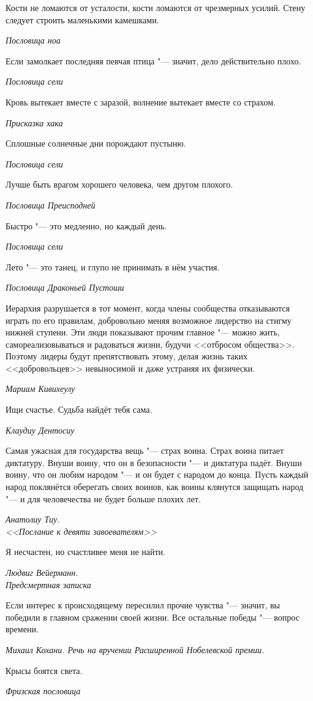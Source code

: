\documentclass[a4paper,10pt]{book}
\begin{document}
\epigraph{Кости не ломаются от усталости, кости ломаются от чрезмерных усилий. Стену следует строить маленькими камешками.}
{\textit{Пословица ноа}}

\epigraph{Если замолкает последняя певчая птица "--- значит, дело действительно плохо.}
{\textit{Пословица сели}}

\epigraph{Кровь вытекает вместе с заразой, волнение вытекает вместе со страхом.}
{\textit{Присказка хака}}

\epigraph{Сплошные солнечные дни порождают пустыню.}
{\textit{Пословица сели}}

\epigraph{Лучше быть врагом хорошего человека, чем другом плохого.}
{\textit{Пословица Преисподней}}

\epigraph{Быстро "--- это медленно, но каждый день.}
{\textit{Пословица сели}}

\epigraph{Лето "--- это танец, и глупо не принимать в нём участия.}
{\textit{Пословица Драконьей Пустоши}}

\epigraph{Иерархия разрушается в тот момент, когда члены сообщества отказываются играть по его правилам, добровольно меняя возможное лидерство на стигму нижней ступени. Эти люди показывают прочим главное "--- можно жить, самореализовываться и радоваться жизни, будучи <<отбросом общества>>. Поэтому лидеры будут препятствовать этому, делая жизнь таких <<добровольцев>> невыносимой и даже устраняя их физически.}
{\textit{Мариам Кивихеулу}}

\epigraph{Ищи счастье. Судьба найдёт тебя сама.}
{\textit{Клаудиу Дентосиу}}

\epigraph{Самая ужасная для государства вещь "--- страх воина.
Страх воина питает диктатуру.
Внуши воину, что он в безопасности "--- и диктатура падёт.
Внуши воину, что он любим народом "--- и он будет с народом до конца.
Пусть каждый народ поклянётся оберегать своих воинов, как воины клянутся защищать народ "--- и для человечества не будет больше плохих лет.}
{\textit{Анатолиу Тиу.\\<<Послание к девяти завоевателям>>}}

\epigraph{Я несчастен, но счастливее меня не найти.}
{\textit{Людвиг Вейерманн.\\
Предсмертная записка}}

\epigraph{Если интерес к происходящему пересилил прочие чувства "--- значит, вы победили в главном сражении своей жизни. Все остальные победы "--- вопрос времени.}
{\textit{Михаил Кохани. Речь на вручении Расширенной Нобелевской премии.}}

\epigraph{Крысы боятся света.}
{\textit{Фризская пословица}}
\end{document}
